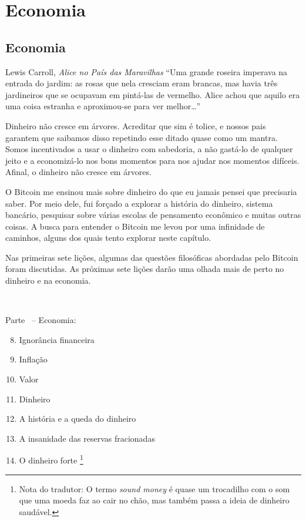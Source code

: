 \part{Economia}
\label{ch:economics}
\chapter*{Economia}

\begin{chapquote}{Lewis Carroll, \textit{Alice no País das Maravilhas}}
\enquote{Uma grande roseira imperava na entrada do jardim: as rosas que nela cresciam eram brancas, mas havia três jardineiros que se ocupavam em pintá-las de vermelho. Alice achou que aquilo era uma coisa estranha e aproximou-se para ver melhor\ldots}
\end{chapquote}

Dinheiro não cresce em árvores. Acreditar que sim é tolice, e nossos pais garantem que saibamos disso repetindo esse ditado quase como um mantra. Somos incentivados a usar o dinheiro com sabedoria, a não gastá-lo de qualquer jeito e a economizá-lo nos bons momentos para nos ajudar nos momentos difíceis. Afinal, o dinheiro não cresce em árvores.

O Bitcoin me ensinou mais sobre dinheiro do que eu jamais pensei que precisaria saber. Por meio dele, fui forçado a explorar a história do dinheiro, sistema bancário, pesquisar sobre várias escolas de pensamento econômico e muitas outras coisas. A busca para entender o Bitcoin me levou por uma infinidade de caminhos, alguns dos quais tento explorar neste capítulo.

Nas primeiras sete lições, algumas das questões filosóficas abordadas pelo Bitcoin foram discutidas. As próximas sete lições darão uma olhada mais de perto no dinheiro e na economia.

~

\begin{samepage}
Parte~\ref{ch:economics} -- Economia:

\begin{enumerate}
  \setcounter{enumi}{7}
  \item Ignorância financeira
  \item Inflação
  \item Valor
  \item Dinheiro
  \item A história e a queda do dinheiro
  \item A insanidade das reservas fracionadas
  \item O dinheiro forte \footnote{Nota do tradutor: O termo \textit{sound money} é quase um trocadilho com o som que uma moeda faz ao cair no chão, mas também passa a ideia de dinheiro saudável.}
\end{enumerate}
\end{samepage}

